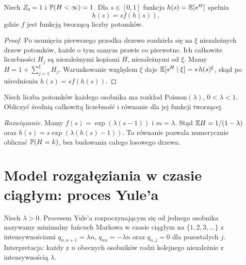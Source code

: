 \begin{stwierdzenie}
Niech $Z_0=1$ i $\mathbb{P}(H<\infty)=1$.
Dla $s\in[0,1]$ funkcja $h(s)=\mathbb{E}[s^H]$ spełnia
\[
h(s)=s f(h(s)),
\]
gdzie $f$ jest funkcją tworzącą liczby potomków.
\end{stwierdzenie}
\begin{proof}
Po usunięciu pierwszego przodka drzewo rozdziela się
na $\xi$ niezależnych drzew potomków, każde o tym samym
prawie co pierwotne. Ich całkowite liczebności $H_j$
są niezależnymi kopiami $H$, niezależnymi od $\xi$.
Mamy $H=1+\sum_{j=1}^\xi H_j$.
Warunkowanie względem $\xi$ daje
$\mathbb{E}[s^H\mid\xi]=s\,h(s)^\xi$, skąd po uśrednieniu
$h(s)=sf(h(s))$.
\end{proof}

\begin{zadanie}
Niech liczba potomków każdego osobnika ma rozkład
$\mathrm{Poisson}(\lambda)$, $0<\lambda<1$.
Obliczyć średnią całkowitą liczebność i równanie
dla jej funkcji tworzącej.

\emph{Rozwiązanie.} Mamy
$f(s)=\exp(\lambda(s-1))$ i $m=\lambda$.
Stąd $\mathbb{E} H=1/(1-\lambda)$ oraz
$h(s)=s\exp(\lambda(h(s)-1))$.
To równanie pozwala numerycznie obliczać
$\mathbb{P}(H=k)$, bez budowania całego losowego drzewa.
\end{zadanie}

\section{Model rozgałęziania w czasie ciągłym: proces Yule'a}
\begin{definicja}
Niech $\lambda>0$. Procesem Yule'a rozpoczynającym się
od jednego osobnika nazywamy minimalny łańcuch Markowa
w czasie ciągłym na $\{1,2,3,\ldots\}$ z intensywnościami
$q_{n,n+1}=\lambda n$, $q_{nn}=-\lambda n$ oraz
$q_{n,j}=0$ dla pozostałych $j$.
Interpretacja: każdy z $n$ obecnych osobników rodzi
kolejnego niezależnie z intensywnością $\lambda$.
\end{definicja}

